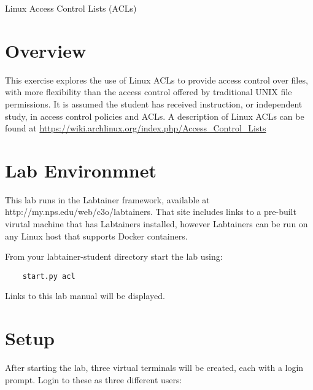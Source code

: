 


\begin{center}
{\LARGE Linux Access Control Lists (ACLs)}
\vspace{0.1in}\\
\end{center}

\copyrightnotice

\section{Overview}
This exercise explores the use of Linux ACLs to provide
access control over files, with more flexibility than 
the access control offered by traditional UNIX file permissions.
It is assumed the student has received instruction, or independent
study, in access control policies and ACLs.  A description of
Linux ACLs can be found at 
\url {https://wiki.archlinux.org/index.php/Access\_Control\_Lists}

\section{Lab Environmnet}
This lab runs in the Labtainer framework,
available at http://my.nps.edu/web/c3o/labtainers.
That site includes links to a pre-built virutal machine
that has Labtainers installed, however Labtainers can
be run on any Linux host that supports Docker containers.

From your labtainer-student directory start the lab using:
\begin{verbatim}
    start.py acl
\end{verbatim}
Links to this lab manual will be displayed.  

\section{Setup}
After starting the lab, three virtual terminals will be created, each with a login
prompt.  Login to these as three different users:

